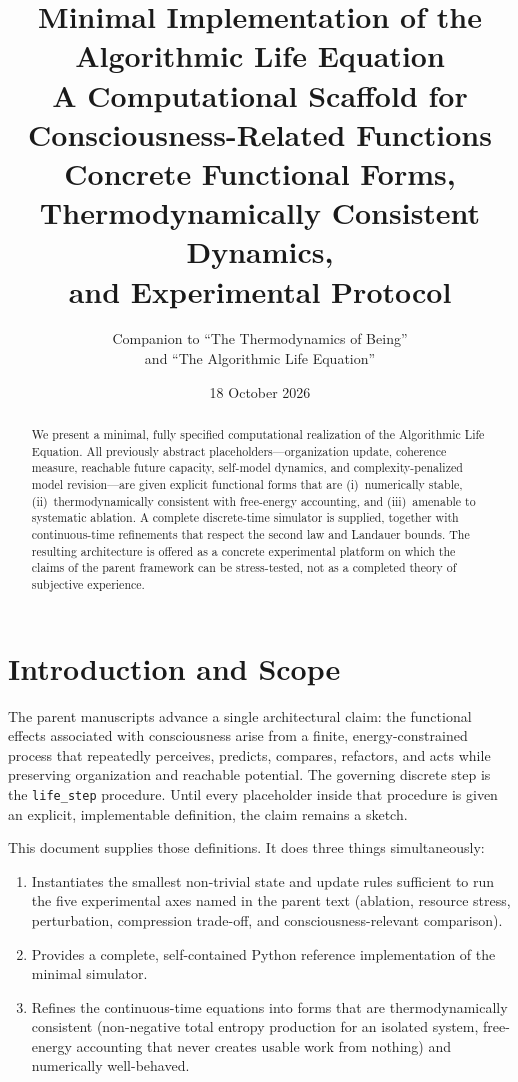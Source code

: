\documentclass[11pt,a4paper]{article}
\title{\textbf{Minimal Implementation of the Algorithmic Life Equation}\\[0.4em]
\large A Computational Scaffold for Consciousness-Related Functions\\[0.3em]
\normalsize Concrete Functional Forms, Thermodynamically Consistent Dynamics,\\ and Experimental Protocol}
\author{Companion to ``The Thermodynamics of Being''\\ and ``The Algorithmic Life Equation''}
\date{18 October 2026}
\begin{document}
\maketitle

\begin{abstract}
We present a minimal, fully specified computational realization of the Algorithmic Life Equation. All previously abstract placeholders---organization update, coherence measure, reachable future capacity, self-model dynamics, and complexity-penalized model revision---are given explicit functional forms that are (i)~numerically stable, (ii)~thermodynamically consistent with free-energy accounting, and (iii)~amenable to systematic ablation. A complete discrete-time simulator is supplied, together with continuous-time refinements that respect the second law and Landauer bounds. The resulting architecture is offered as a concrete experimental platform on which the claims of the parent framework can be stress-tested, not as a completed theory of subjective experience.
\end{abstract}

\tableofcontents
\newpage

\section{Introduction and Scope}

The parent manuscripts advance a single architectural claim: the functional effects associated with consciousness arise from a finite, energy-constrained process that repeatedly perceives, predicts, compares, refactors, and acts while preserving organization and reachable potential. The governing discrete step is the \texttt{life\_step} procedure. Until every placeholder inside that procedure is given an explicit, implementable definition, the claim remains a sketch.

This document supplies those definitions. It does three things simultaneously:

\begin{enumerate}[leftmargin=*]
  \item Instantiates the smallest non-trivial state and update rules sufficient to run the five experimental axes named in the parent text (ablation, resource stress, perturbation, compression trade-off, and consciousness-relevant comparison).
  \item Provides a complete, self-contained Python reference implementation of the minimal simulator.
  \item Refines the continuous-time equations into forms that are thermodynamically consistent (non-negative total entropy production for an isolated system, free-energy accounting that never creates usable work from nothing) and numerically well-behaved.
\end{enumerate}
\end{document}
